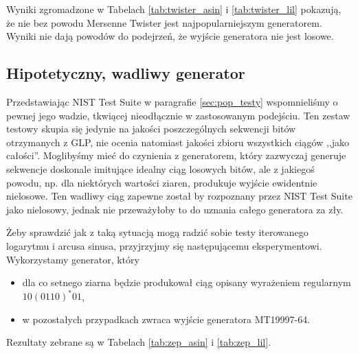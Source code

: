 \documentclass[a4paper,11pt,twoside]{book}
\theoremstyle{definition}
\begin{document}
Wyniki zgromadzone w Tabelach \ref{tab:twister_asin} i \ref{tab:twister_lil} pokazują, że nie bez powodu Mersenne Twister jest najpopularniejszym generatorem. Wyniki nie dają powodów do podejrzeń, że wyjście generatora nie jest losowe.

\FloatBarrier
\subsection{Hipotetyczny, wadliwy generator}
Przedstawiając NIST Test Suite w paragrafie \ref{sec:pop_testy} wspomnieliśmy o pewnej jego wadzie, tkwiącej nieodłącznie w zastosowanym podejściu. Ten zestaw testowy skupia się jedynie na jakości poszczególnych sekwencji bitów otrzymanych z GLP, nie ocenia natomiast jakości zbioru wszystkich ciągów ,,jako całości''. Moglibyśmy mieć do czynienia z generatorem, który zazwyczaj generuje sekwencje doskonale imitujące idealny ciąg losowych bitów, ale z jakiegoś powodu, np. dla niektórych wartości ziaren, produkuje wyjście ewidentnie nielosowe. Ten wadliwy ciąg zapewne został by rozpoznany przez NIST Test Suite jako nielosowy, jednak nie przeważyłoby to do uznania całego generatora za zły.

Żeby sprawdzić jak z taką sytuacją mogą radzić sobie testy iterowanego logarytmu i arcusa sinusa, przyjrzyjmy się następującemu eksperymentowi. Wykorzystamy generator, który
\begin{itemize}
  \setlength\itemsep{1pt}
 \item dla co setnego ziarna będzie produkował ciąg opisany wyrażeniem regularnym $10(0110)^*01$,
 \item w pozostałych przypadkach zwraca wyjście generatora MT19997-64.
\end{itemize}
Rezultaty zebrane są w Tabelach \ref{tab:zep_asin} i \ref{tab:zep_lil}.
\end{document}
